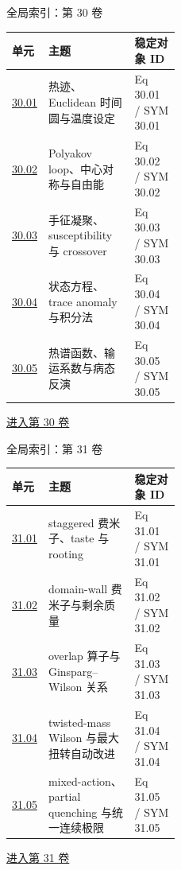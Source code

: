 \documentclass[aspectratio=169,10pt]{ctexbeamer}
\begin{document}
\begin{frame}[t]{全局索引：第 30 卷}
\small\begin{tabularx}{\linewidth}{p{0.15\linewidth}Yp{0.27\linewidth}}
\toprule 单元 & 主题 & 稳定对象 ID\\\midrule
\hyperlink{Fr:30.01-1}{30.01} & 热迹、Euclidean 时间圆与温度设定 & Eq 30.01 / SYM 30.01\\
\hyperlink{Fr:30.02-1}{30.02} & Polyakov loop、中心对称与自由能 & Eq 30.02 / SYM 30.02\\
\hyperlink{Fr:30.03-1}{30.03} & 手征凝聚、susceptibility 与 crossover & Eq 30.03 / SYM 30.03\\
\hyperlink{Fr:30.04-1}{30.04} & 状态方程、trace anomaly 与积分法 & Eq 30.04 / SYM 30.04\\
\hyperlink{Fr:30.05-1}{30.05} & 热谱函数、输运系数与病态反演 & Eq 30.05 / SYM 30.05\\
\bottomrule\end{tabularx}
\vfill\hyperlink{Fr:V30-title}{进入第 30 卷}
\end{frame}

\begin{frame}[t]{全局索引：第 31 卷}
\small\begin{tabularx}{\linewidth}{p{0.15\linewidth}Yp{0.27\linewidth}}
\toprule 单元 & 主题 & 稳定对象 ID\\\midrule
\hyperlink{Fr:31.01-1}{31.01} & staggered 费米子、taste 与 rooting & Eq 31.01 / SYM 31.01\\
\hyperlink{Fr:31.02-1}{31.02} & domain-wall 费米子与剩余质量 & Eq 31.02 / SYM 31.02\\
\hyperlink{Fr:31.03-1}{31.03} & overlap 算子与 Ginsparg--Wilson 关系 & Eq 31.03 / SYM 31.03\\
\hyperlink{Fr:31.04-1}{31.04} & twisted-mass Wilson 与最大扭转自动改进 & Eq 31.04 / SYM 31.04\\
\hyperlink{Fr:31.05-1}{31.05} & mixed-action、partial quenching 与统一连续极限 & Eq 31.05 / SYM 31.05\\
\bottomrule\end{tabularx}
\vfill\hyperlink{Fr:V31-title}{进入第 31 卷}
\end{frame}
\end{document}
